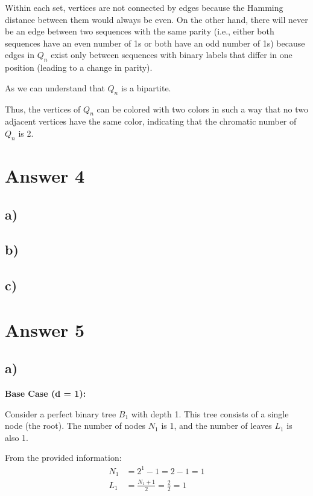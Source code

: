 \documentclass[12pt]{article}
\begin{document}
Within each set, vertices are not connected by edges because the Hamming distance between them would always be even. On the other hand, there will never be an edge between two sequences with the same parity (i.e., either both sequences have an even number of 1s or both have an odd number of 1s) because edges in \( Q_n \) exist only between sequences with binary labels that differ in one position (leading to a change in parity).

As we can understand that \( Q_n \) is a bipartite.

Thus, the vertices of \( Q_n \) can be colored with two colors in such a way that no two adjacent vertices have the same color, indicating that the chromatic number of \( Q_n \) is 2.


\section*{Answer 4}

\subsection*{a)}

\subsection*{b)}

\subsection*{c)}


\section*{Answer 5}

\subsection*{a)}

\textbf{Base Case (d = 1):}

Consider a perfect binary tree \( B_1 \) with depth 1. This tree consists of a single node (the root). The number of nodes \( N_1 \) is 1, and the number of leaves \( L_1 \) is also 1.

From the provided information:
\begin{align*}
N_1 &= 2^1 - 1 = 2 - 1 = 1 \\
L_1 &= \frac{N_1 + 1}{2} = \frac{2}{2} = 1
\end{align*}
\end{document}
